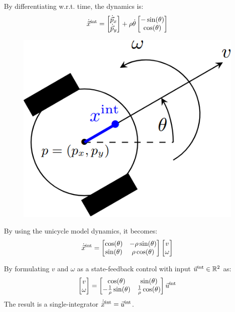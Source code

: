 \begin{description}
        By differentiating w.r.t. time, the dynamics is:
        \[
            \dot{{\vec{x}}}^\text{int} = \begin{bmatrix}
                \dot{\vec{p}}_x \\ \dot{\vec{p}}_y
            \end{bmatrix}
            +
            \rho \dot{\theta} \begin{bmatrix}
                - \sin(\theta) \\ \cos(\theta)
            \end{bmatrix}
        \]

        \begin{figure}[H]
            \centering
            \includegraphics[width=0.2\linewidth]{./img/single_unicycle_map.png}
        \end{figure}

        By using the unicycle model dynamics, it becomes:
        \[
            \dot{{\vec{x}}}^\text{int} = \begin{bmatrix}
                \cos(\theta) & -\rho\sin(\theta) \\
                \sin(\theta) & \rho\cos(\theta) \\
            \end{bmatrix}
            \begin{bmatrix}
                v \\ \omega
            \end{bmatrix}
        \]

        By formulating $v$ and $\omega$ as a state-feedback control with input ${\vec{u}}^\text{int} \in \mathbb{R}^2$ as:
        \[
            \begin{bmatrix}
                v \\ \omega
            \end{bmatrix}
            =
            \begin{bmatrix}
                \cos(\theta) & \sin(\theta) \\
                -\frac{1}{\rho} \sin(\theta) & \frac{1}{\rho} \cos(\theta)
            \end{bmatrix} {\vec{u}}^\text{int}
        \]
        The result is a single-integrator $\dot{{\vec{x}}}^\text{int} = {\vec{u}}^\text{int}$.
\end{description}